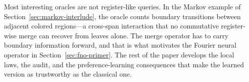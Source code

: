Most interesting oracles are not register-like queries. In the Markov example of Section~\ref{sec:markov-interlude}, the oracle counts boundary transitions between adjacent colored regions---a cross-span interaction that no commutative register-wise merge can recover from leaves alone. The merge operator has to carry boundary information forward, and that is what motivates the Fourier neural operator in Section~\ref{sec:fno-primer}. The rest of the paper develops the local laws, the audit, and the preference-learning consequences that make the learned version as trustworthy as the classical one.
